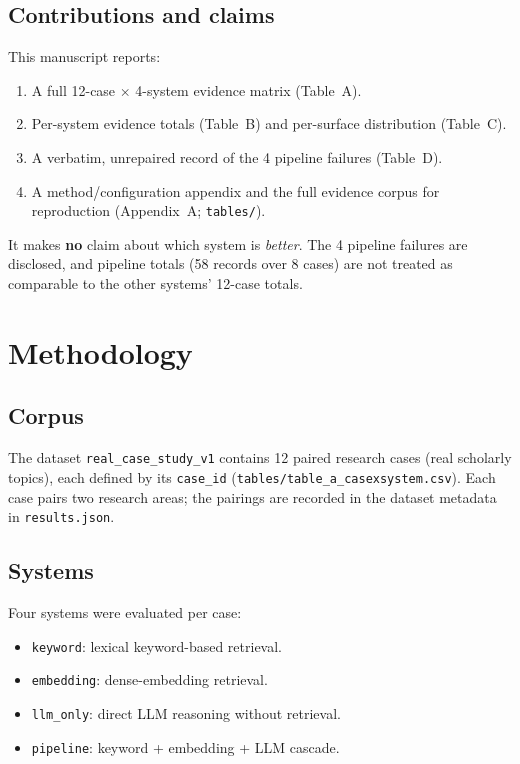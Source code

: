 \documentclass[11pt]{article}
\begin{document}
\subsection{Contributions and claims}
This manuscript reports:
\begin{enumerate}
    \item A full 12-case $\times$ 4-system evidence matrix (Table~A).
    \item Per-system evidence totals (Table~B) and per-surface distribution
    (Table~C).
    \item A verbatim, unrepaired record of the 4 pipeline failures (Table~D).
    \item A method/configuration appendix and the full evidence corpus for
    reproduction (Appendix~A; \texttt{tables/}).
\end{enumerate}
It makes \textbf{no} claim about which system is \emph{better}. The 4 pipeline
failures are disclosed, and pipeline totals (58 records over 8 cases) are not
treated as comparable to the other systems' 12-case totals.

\section{Methodology}
\label{sec:method}

\subsection{Corpus}
The dataset \texttt{real\_case\_study\_v1} contains 12 paired research cases
(real scholarly topics), each defined by its \texttt{case\_id}
(\texttt{tables/table\_a\_casexsystem.csv}). Each case pairs two research areas;
the pairings are recorded in the dataset metadata in \texttt{results.json}.

\subsection{Systems}
Four systems were evaluated per case:
\begin{itemize}
    \item \texttt{keyword}: lexical keyword-based retrieval.
    \item \texttt{embedding}: dense-embedding retrieval.
    \item \texttt{llm\_only}: direct LLM reasoning without retrieval.
    \item \texttt{pipeline}: keyword + embedding + LLM cascade.
\end{itemize}
\end{document}
